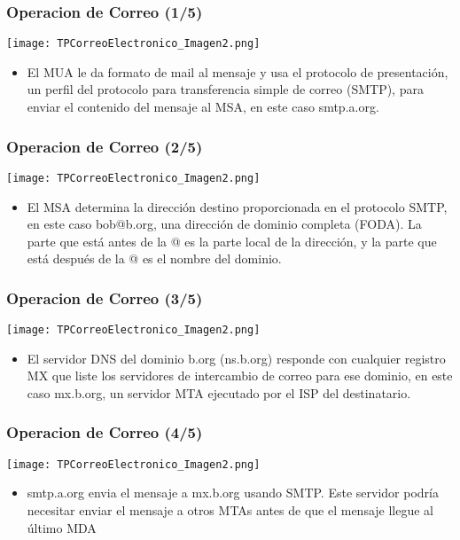 \documentclass{beamer}
\begin{document}
\begin{frame}
\frametitle{Operacion de Correo (1/5)}
\tableofcontents

\centering
\texttt{[image: TPCorreoElectronico\_Imagen2.png]}
\begin{itemize}
\item El MUA le da formato de mail al mensaje y usa el protocolo de presentación, un perfil del protocolo para transferencia simple de correo (SMTP), para enviar el contenido del mensaje al MSA, en este caso smtp.a.org.
\end{itemize}

\end{frame}

\begin{frame}
\frametitle{Operacion de Correo (2/5)}
\tableofcontents
\centering
\texttt{[image: TPCorreoElectronico\_Imagen2.png]}
\begin{itemize}
\item \small El MSA determina la dirección destino proporcionada en el protocolo SMTP, en este caso bob@b.org, una dirección de dominio completa (FODA). La parte que está antes de la @ es la parte local de la dirección, y la parte que está después de la @ es el nombre del dominio.
\end{itemize}

\end{frame}

\begin{frame}
\frametitle{Operacion de Correo (3/5)}
\tableofcontents
\centering
\texttt{[image: TPCorreoElectronico\_Imagen2.png]}
\begin{itemize}
\item \small El servidor DNS del dominio b.org (ns.b.org) responde con cualquier registro MX que liste los servidores de intercambio de correo para ese dominio, en este caso mx.b.org, un servidor MTA ejecutado por el ISP del destinatario.
\end{itemize}

\end{frame}

\begin{frame}
\frametitle{Operacion de Correo (4/5)}
\tableofcontents
\centering
\texttt{[image: TPCorreoElectronico\_Imagen2.png]}
\begin{itemize}
\item smtp.a.org envia el mensaje a mx.b.org usando SMTP. Este servidor podría necesitar enviar el mensaje a otros MTAs antes de que el mensaje llegue al último MDA
\end{itemize}

\end{frame}
\end{document}
